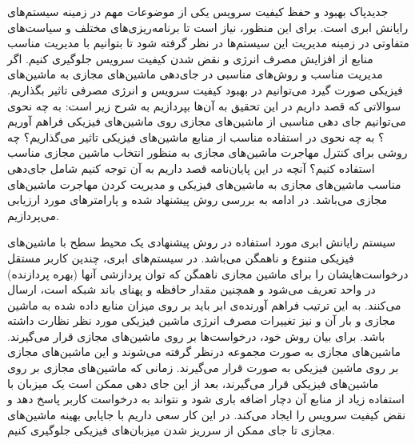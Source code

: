‌جدید‌پاک
 بهبود و حفظ کیفیت سرویس یکی از موضوعات مهم در زمینه سیستم‌های رایانش ابری است. برای این منظور، نیاز است تا برنامه‌ریزی‌های مختلف و سیاست‌های متفاوتی در زمینه مدیریت این سیستم‌ها در نظر گرفته شود تا بتوانیم با مدیریت مناسب منابع از افزایش مصرف انرژی  و نقض شدن کیفیت سرویس جلوگیری کنیم. اگر مدیریت مناسب و روش‌های مناسبی در جای‌دهی ماشین‌های مجازی به ماشین‌های فیزیکی صورت گیرد می‌توانیم در بهبود کیفیت سرویس و انرژی مصرفی تاثیر بگذاریم. سوالاتی که قصد داریم  در این تحقیق به آن‌ها بپردازیم به شرح زیر است:
 به چه نحوی می‌توانیم جای دهی مناسبی از ماشین‌های مجازی روی ماشین‌های فیزیکی فراهم آوریم ؟
 به چه نحوی در استفاده مناسب از منابع ماشین‌های فیزیکی تاثیر می‌گذاریم؟
 چه روشی برای کنترل مهاجرت ماشین‌های مجازی به منظور انتخاب ماشین مجازی مناسب استفاده کنیم؟
آنچه در این پایان‌نامه قصد داریم به آن توجه کنیم شامل جای‌دهی مناسب ماشین‌های مجازی به ماشین‌های فیزیکی و مدیریت کردن مهاجرت ماشین‌های مجازی می‌باشد. 
در ادامه به بررسی روش پیشنهاد شده و پارامتر‌های مورد ارزیابی می‌پردازیم.

سیستم رایانش ابری مورد استفاده در روش پیشنهادی یک محیط سطح
 با ماشین‌های فیزیکی متنوع و ناهمگن می‌باشد. در سیستم‌های ابری، چندین کاربر مستقل درخواست‌هایشان را برای
  ماشین مجازی ناهمگن که توان پردازشی آنها (بهره پردازنده) در واحد
    تعریف می‌شود و همچنین مقدار حافظه و پهنای باند شبکه است، ارسال می‌کنند. به این ترتیب فراهم آورنده‌ی ابر باید بر روی میزان منابع داده شده به ماشین مجازی و بار آن و نیز تغییرات مصرف انرژی ماشین فیزیکی مورد نظر نظارت داشته باشد. 
برای بیان روش خود، درخواست‌ها بر روی ماشین‌های مجازی قرار می‌گیرند. ماشین‌های مجازی به صورت مجموعه
 درنظر گرفته می‌شوند و این ماشین‌های مجازی بر روی 
 ماشین فیزیکی به صورت 
  قرار می‌گیرند. زمانی که ماشین‌های مجازی بر روی ماشین‌های فیزیکی قرار می‌گیرند، بعد از این جای دهی ممکن است یک میزبان با استفاده زیاد از منابع آن دچار اضافه باری شود و نتواند به درخواست کاربر پاسخ دهد و نقض کیفیت سرویس را ایجاد می‌کند. در این کار سعی داریم با جایابی بهینه ماشین‌های مجازی تا جای ممکن از سرریز شدن میزبان‌های فیزیکی جلوگیری کنیم.
  
